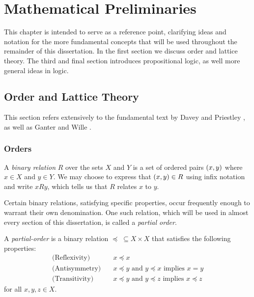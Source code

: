\chapter{Mathematical Preliminaries}
\label{chapter:mathematical-preliminaries}

This chapter is intended to serve as a reference point, clarifying ideas and notation for the more fundamental concepts that will be used throughout the remainder of this dissertation.
In the first section we discuss order and lattice theory. The third and final section introduces propositional logic, as well more general ideas in logic.

\section{Order and Lattice Theory}
\label{section:order-theory}

This section refers extensively to the fundamental text by Davey and Priestley \cite{davey2002introduction}, as well as Ganter and Wille \cite{ganter1999formal}.

\subsection{Orders}
\label{subsection:orders}

A \textit{binary relation}  $R$ over the sets $X$ and $Y$ is a set of ordered pairs $(x,y)$ where $x \in X$ and $y \in Y$. We may choose to express that $(x,y)\in R$ using infix notation and write $xRy$, which tells us that $R$ relates $x$ to $y$.

Certain binary relations, satisfying specific properties, occur frequently enough to warrant their own denomination. One such relation, which will be used in almost every section
of this dissertation, is called a \textit{partial order}.

\begin{definition}
  \label{definition:partial-order} A \textit{partial-order}  is a binary relation $\preceq \; \subseteq X \times X$ that satisfies the following properties:
  \begin{align}
    \text{(Reflexivity)}\quad  & x \preceq x                                                     \\
    \text{(Antisymmetry)}\quad & x \preceq y \text{ and }y \preceq x \text{ implies }x = y       \\
    \text{(Transitivity)}\quad & x \preceq y \text{ and }y \preceq z \text{ implies }x \preceq z
  \end{align}
  for all $x,y,z \in X$.
\end{definition}

